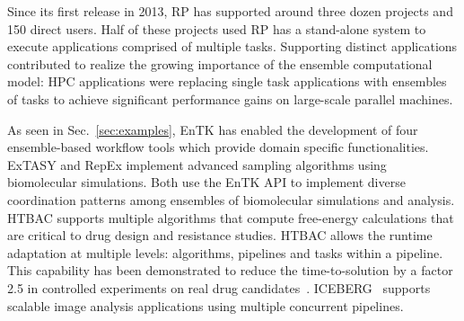 \documentclass[preprint,12pt, a4paper]{elsarticle}
\begin{document}



Since its first release in 2013, RP has supported around three dozen projects
and 150 direct users. Half of these projects used RP has a stand-alone system
to execute applications comprised of multiple tasks. Supporting distinct
applications contributed to realize the growing importance of the
ensemble computational model: HPC applications were replacing single task
applications with ensembles of tasks to achieve significant performance gains
on large-scale parallel machines.

As seen in Sec.~\ref{sec:examples}, EnTK has enabled the development of four
ensemble-based workflow tools which provide domain specific functionalities.
ExTASY and RepEx implement advanced sampling algorithms using biomolecular
simulations. Both use the EnTK API to implement  diverse coordination patterns
among ensembles of biomolecular simulations and analysis. HTBAC supports
multiple algorithms that compute free-energy calculations that are critical to
drug design and resistance studies. HTBAC allows the runtime adaptation at
multiple levels: algorithms, pipelines and tasks within a pipeline. This
capability has been demonstrated to reduce the time-to-solution by a factor 2.5
in controlled experiments on real drug candidates~\citep{dakka2018concurrent}.
ICEBERG~\cite{paraskevakos2019workflow} supports scalable image analysis
applications using multiple concurrent pipelines.
\end{document}
